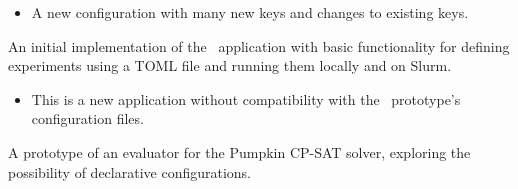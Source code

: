 \breakingchanges
\begin{itemize}
\item A new configuration with many new keys and
changes to existing keys.
\end{itemize}


An initial implementation of the \gourdtest\ application
with basic functionality for defining experiments using a
TOML file and running them locally and on Slurm.

\breakingchanges
\begin{itemize}
\item This is a new application without compatibility with
the \gourdtest\ prototype's configuration files.
\end{itemize}


A prototype of an evaluator for the Pumpkin CP-SAT solver,
exploring the possibility of declarative configurations.

\clearpage
